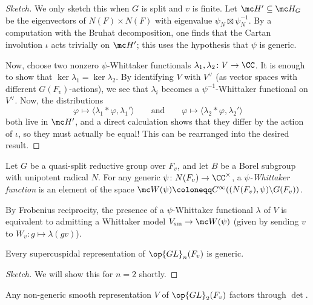 \documentclass{article}
\begin{document}
\begin{proof}[Sketch]
	We only sketch this when $G$ is split and $v$ is finite. Let $\mc H'\subseteq\mc H_G$ be the eigenvectors of $N(F)\times N(F)$ with eigenvalue $\psi_N\boxtimes\psi_N^{-1}$. By a computation with the Bruhat decomposition, one finds that the Cartan involution $\iota$ acts trivially on $\mc H'$; this uses the hypothesis that $\psi$ is generic.

	Now, choose two nonzero $\psi$-Whittaker functionals $\lambda_1,\lambda_2\colon V\to\CC$. It is enough to show that $\ker\lambda_1=\ker\lambda_2$. By identifying $V$ with $V^\lor$ (as vector spaces with different $G(F_v)$-actions), we see that $\lambda_i$ becomes a $\psi^{-1}$-Whittaker functional on $V^\lor$. Now, the distributions
	\[\varphi\mapsto\langle\lambda_1*\varphi,\lambda_1'\rangle\qquad\text{and}\qquad\varphi\mapsto\langle\lambda_2*\varphi,\lambda_2'\rangle\]
	both live in $\mc H'$, and a direct calculation shows that they differ by the action of $\iota$, so they must actually be equal! This can be rearranged into the desired result.\todo{}
\end{proof}
\begin{definition}
	Let $G$ be a quasi-split reductive group over $F_v$, and let $B$ be a Borel subgroup with unipotent radical $N$. For any generic $\psi\colon N(F_v)\to\CC^\times$, a \textit{$\psi$-Whittaker function} is an element of the space $\mc W(\psi)\coloneqq C^\infty((N(F_v),\psi)\backslash G(F_v))$.
\end{definition}
\begin{remark}
	By Frobenius reciprocity, the presence of a $\psi$-Whittaker functional $\lambda$ of $V$ is equivalent to admitting a Whittaker model $V_{\mathrm{sm}}\to\mc W(\psi)$ (given by sending $v$ to $W_v\colon g\mapsto\lambda(gv)$).
\end{remark}
\begin{theorem}
	Every supercuspidal representation of $\op{GL}_n(F_v)$ is generic.
\end{theorem}
\begin{proof}[Sketch]
	We will show this for $n=2$ shortly.
\end{proof}
\begin{proposition}
	Any non-generic smooth representation $V$ of $\op{GL}_2(F_v)$ factors through $\det$.
\end{proposition}
\end{document}
